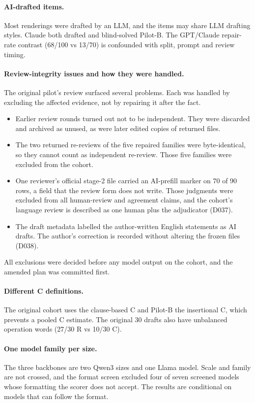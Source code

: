 \documentclass[12pt,a4paper,oneside]{report}
\renewcommand{\_}{\oldunderscore\allowbreak}
\begin{document}
\paragraph{AI-drafted items.} Most renderings were drafted by an LLM, and the items may share LLM drafting styles. Claude both drafted and blind-solved Pilot-B. The GPT/Claude repair-rate contrast (68/100 vs 13/70) is confounded with split, prompt and review timing.

\paragraph{Review-integrity issues and how they were handled.} The original pilot's review surfaced several problems. Each was handled by excluding the affected evidence, not by repairing it after the fact.
\begin{itemize}[nosep]
\item Earlier review rounds turned out not to be independent. They were discarded and archived as unused, as were later edited copies of returned files.
\item The two returned re-reviews of the five repaired families were byte-identical, so they cannot count as independent re-review. Those five families were excluded from the cohort.
\item One reviewer's official stage-2 file carried an AI-prefill marker on 70 of 90 rows, a field that the review form does not write. Those judgments were excluded from all human-review and agreement claims, and the cohort's language review is described as one human plus the adjudicator (D037).
\item The draft metadata labelled the author-written English statements as AI drafts. The author's correction is recorded without altering the frozen files (D038).
\end{itemize}
All exclusions were decided before any model output on the cohort, and the amended plan was committed first.

\paragraph{Different C definitions.} The original cohort uses the clause-based C and Pilot-B the insertional C, which prevents a pooled C estimate. The original 30 drafts also have unbalanced operation words (27/30 R vs 10/30 C).

\paragraph{One model family per size.} The three backbones are two Qwen3 sizes and one Llama model. Scale and family are not crossed, and the format screen excluded four of seven screened models whose formatting the scorer does not accept. The results are conditional on models that can follow the format.
\end{document}
